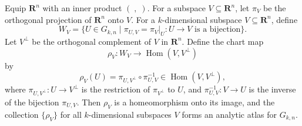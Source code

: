 Equip $\mathbf{R}^n$ with an inner product $(\;,\;)$. For a subspace $V \subseteq \mathbf{R}^n$, let $\pi_V$ be the orthogonal projection of $\mathbf{R}^n$ onto $V$. For a $k$-dimensional subspace $V \subseteq \mathbf{R}^n$, define
\[
W_V = \{U \in G_{k,n} \mid \pi_{U,V} = \pi_V|_U : U \to V \text{ is a bijection}\}.
\]
Let $V^\perp$ be the orthogonal complement of $V$ in $\mathbf{R}^n$. Define the chart map
\[
\rho_V : W_V \to \operatorname{Hom}(V, V^\perp)
\]
by
\[
\rho_V(U) = \pi_{U,V^\perp} \circ \pi_{U,V}^{-1} \in \operatorname{Hom}(V, V^\perp),
\]
where $\pi_{U,V^\perp} : U \to V^\perp$ is the restriction of $\pi_{V^\perp}$ to $U$, and $\pi_{U,V}^{-1} : V \to U$ is the inverse of the bijection $\pi_{U,V}$. Then $\rho_V$ is a homeomorphism onto its image, and the collection $\{\rho_V\}$ for all $k$-dimensional subspaces $V$ forms an analytic atlas for $G_{k,n}$.
